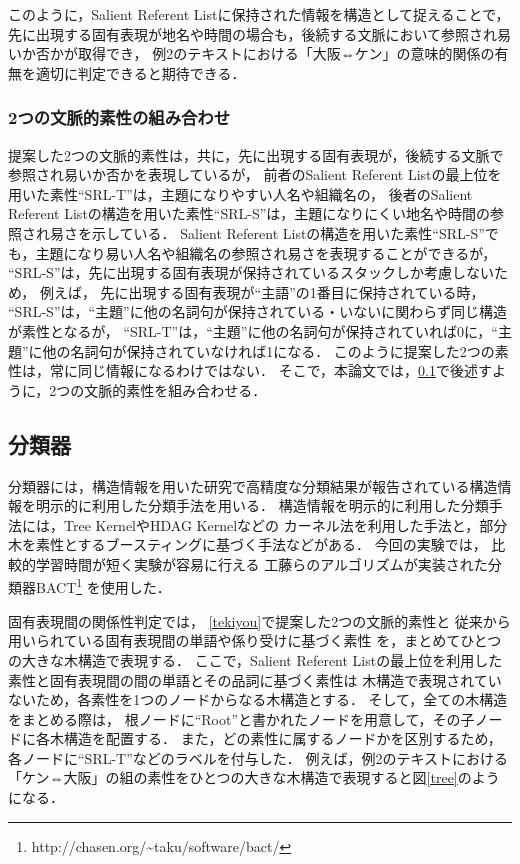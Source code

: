 \documentclass[japanese]{jnlp_1.4}
\begin{document}
このように，Salient Referent Listに保持された情報を構造として捉えることで，
先に出現する固有表現が地名や時間の場合も，後続する文脈において参照され易いか否かが取得でき，
例2のテキストにおける「大阪⇔ケン」の意味的関係の有無を適切に判定できると期待できる．




\subsubsection{2つの文脈的素性の組み合わせ}
\label{kumiawase}

提案した2つの文脈的素性は，共に，先に出現する固有表現が，後続する文脈で参照され易いか否かを表現しているが，
前者のSalient Referent Listの最上位を用いた素性``SRL-T''は，主題になりやすい人名や組織名の，
後者のSalient Referent Listの構造を用いた素性``SRL-S''は，主題になりにくい地名や時間の参照され易さを示している．
Salient Referent Listの構造を用いた素性``SRL-S''でも，主題になり易い人名や組織名の参照され易さを表現することができるが，
``SRL-S''は，先に出現する固有表現が保持されているスタックしか考慮しないため，
例えば，
先に出現する固有表現が``主語''の1番目に保持されている時，
``SRL-S''は，``主題''に他の名詞句が保持されている・いないに関わらず同じ構造が素性となるが，
``SRL-T''は，``主題''に他の名詞句が保持されていれば0に，``主題''に他の名詞句が保持されていなければ1になる．
このように提案した2つの素性は，常に同じ情報になるわけではない．
そこで，本論文では，{\ref{bunrui}}で後述すように，2つの文脈的素性を組み合わせる．



\subsection{分類器}
\label{bunrui}


分類器には，構造情報を用いた研究で高精度な分類結果が報告されている構造情報を明示的に利用した分類手法を用いる．
構造情報を明示的に利用した分類手法には，Tree Kernel\cite{collins2002ckn}やHDAG Kernel\cite{suzuki2005kai}などの
カーネル法を利用した手法と，部分木を素性とするブースティングに基づく手法\cite{kudo2004han}などがある．
今回の実験では，
比較的学習時間が短く実験が容易に行える
工藤らのアルゴリズムが実装された分類器BACT\footnote{
http://chasen.org/\~{}taku/software/bact/}
を使用した．

固有表現間の関係性判定では，
{\ref{tekiyou}}で提案した2つの文脈的素性と
従来から用いられている固有表現間の単語や係り受けに基づく素性
を，まとめてひとつの大きな木構造で表現する．
ここで，Salient Referent Listの最上位を利用した素性と固有表現間の間の単語とその品詞に基づく素性は
木構造で表現されていないため，各素性を1つのノードからなる木構造とする．
そして，全ての木構造をまとめる際は，
根ノードに``Root''と書かれたノードを用意して，その子ノードに各木構造を配置する．
また，どの素性に属するノードかを区別するため，各ノードに``SRL-T''などのラベルを付与した．
例えば，例2のテキストにおける「ケン⇔大阪」の組の素性をひとつの大きな木構造で表現すると図{\ref{tree}}のようになる．
\end{document}
